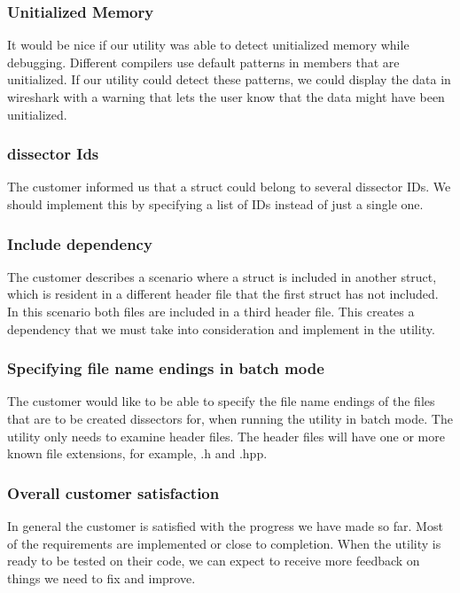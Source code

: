 \subsubsection{Unitialized Memory}
It would be nice if our \gls{utility} was able to detect unitialized memory while debugging.
Different compilers use default patterns in \glspl{member} that are unitialized. If our \gls{utility} could detect these patterns,
we could display the data in \Gls{wireshark} with a warning that lets the user know that the data might have been unitialized.

\subsubsection{\Gls{dissector} Ids}
The customer informed us that a \gls{struct} could belong to several \gls{dissector} IDs.
We should implement this by specifying a list of IDs instead of just a single one.

\subsubsection{Include dependency}
The customer describes a scenario where a \gls{struct} is included in another \gls{struct}, which is resident in a different \gls{header} file
that the first \gls{struct} has not included. In this scenario both files are included in a third \gls{header} file.
This creates a dependency that we must take into consideration and implement in the \gls{utility}.

\subsubsection{Specifying file name endings in \gls{batch mode}}
The customer would like to be able to specify the file name endings of the files that are to be created \glspl{dissector} for,
when running the \gls{utility} in \gls{batch mode}. The \gls{utility} only needs to examine \gls{header} files. The \gls{header} files will have one or more known
file extensions, for example, .h and .hpp.

\subsubsection{Overall customer satisfaction}
In general the customer is satisfied with the progress we have made so far. Most of the requirements are
implemented or close to completion. When the \gls{utility} is ready to be tested on their code, we can expect to receive more
feedback on things we need to fix and improve.

